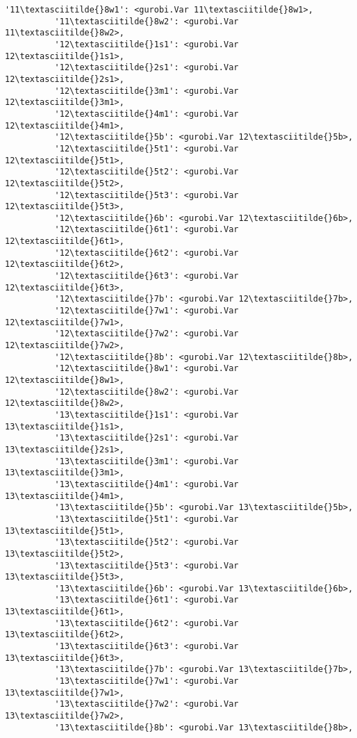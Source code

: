 \documentclass[11pt]{article}
\begin{document}
\begin{Verbatim}[commandchars=\\\{\}]
          '11\textasciitilde{}8w1': <gurobi.Var 11\textasciitilde{}8w1>,
          '11\textasciitilde{}8w2': <gurobi.Var 11\textasciitilde{}8w2>,
          '12\textasciitilde{}1s1': <gurobi.Var 12\textasciitilde{}1s1>,
          '12\textasciitilde{}2s1': <gurobi.Var 12\textasciitilde{}2s1>,
          '12\textasciitilde{}3m1': <gurobi.Var 12\textasciitilde{}3m1>,
          '12\textasciitilde{}4m1': <gurobi.Var 12\textasciitilde{}4m1>,
          '12\textasciitilde{}5b': <gurobi.Var 12\textasciitilde{}5b>,
          '12\textasciitilde{}5t1': <gurobi.Var 12\textasciitilde{}5t1>,
          '12\textasciitilde{}5t2': <gurobi.Var 12\textasciitilde{}5t2>,
          '12\textasciitilde{}5t3': <gurobi.Var 12\textasciitilde{}5t3>,
          '12\textasciitilde{}6b': <gurobi.Var 12\textasciitilde{}6b>,
          '12\textasciitilde{}6t1': <gurobi.Var 12\textasciitilde{}6t1>,
          '12\textasciitilde{}6t2': <gurobi.Var 12\textasciitilde{}6t2>,
          '12\textasciitilde{}6t3': <gurobi.Var 12\textasciitilde{}6t3>,
          '12\textasciitilde{}7b': <gurobi.Var 12\textasciitilde{}7b>,
          '12\textasciitilde{}7w1': <gurobi.Var 12\textasciitilde{}7w1>,
          '12\textasciitilde{}7w2': <gurobi.Var 12\textasciitilde{}7w2>,
          '12\textasciitilde{}8b': <gurobi.Var 12\textasciitilde{}8b>,
          '12\textasciitilde{}8w1': <gurobi.Var 12\textasciitilde{}8w1>,
          '12\textasciitilde{}8w2': <gurobi.Var 12\textasciitilde{}8w2>,
          '13\textasciitilde{}1s1': <gurobi.Var 13\textasciitilde{}1s1>,
          '13\textasciitilde{}2s1': <gurobi.Var 13\textasciitilde{}2s1>,
          '13\textasciitilde{}3m1': <gurobi.Var 13\textasciitilde{}3m1>,
          '13\textasciitilde{}4m1': <gurobi.Var 13\textasciitilde{}4m1>,
          '13\textasciitilde{}5b': <gurobi.Var 13\textasciitilde{}5b>,
          '13\textasciitilde{}5t1': <gurobi.Var 13\textasciitilde{}5t1>,
          '13\textasciitilde{}5t2': <gurobi.Var 13\textasciitilde{}5t2>,
          '13\textasciitilde{}5t3': <gurobi.Var 13\textasciitilde{}5t3>,
          '13\textasciitilde{}6b': <gurobi.Var 13\textasciitilde{}6b>,
          '13\textasciitilde{}6t1': <gurobi.Var 13\textasciitilde{}6t1>,
          '13\textasciitilde{}6t2': <gurobi.Var 13\textasciitilde{}6t2>,
          '13\textasciitilde{}6t3': <gurobi.Var 13\textasciitilde{}6t3>,
          '13\textasciitilde{}7b': <gurobi.Var 13\textasciitilde{}7b>,
          '13\textasciitilde{}7w1': <gurobi.Var 13\textasciitilde{}7w1>,
          '13\textasciitilde{}7w2': <gurobi.Var 13\textasciitilde{}7w2>,
          '13\textasciitilde{}8b': <gurobi.Var 13\textasciitilde{}8b>,

\end{Verbatim}
\end{document}
